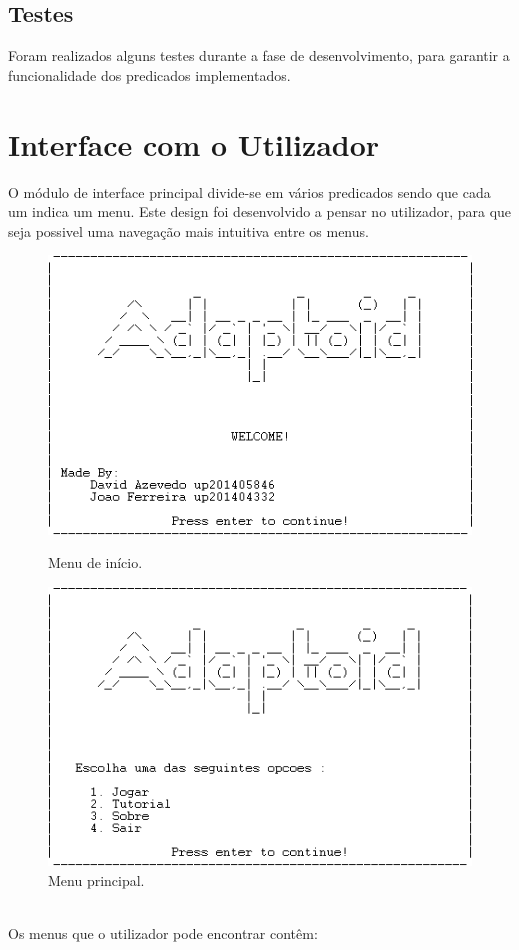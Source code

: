 \documentclass[a4paper]{article}
\begin{document}
\subsection{Testes}

Foram realizados alguns testes durante a fase de desenvolvimento, para garantir a funcionalidade dos predicados implementados.


\newpage
\section{Interface com o Utilizador}

O módulo de interface principal divide-se em vários predicados sendo que cada um indica um menu. Este design foi desenvolvido a pensar no utilizador, para que seja possivel uma navegação mais intuitiva entre os menus.
\begin{figure}[h]
    \begin{minipage}[b]{0.4\textwidth}
        \includegraphics[scale=0.5]{menuPrincipal}
        \caption{Menu de início.}
    \end{minipage}
    \begin{minipage}[b]{0.4\textwidth}
        \includegraphics[scale=0.5]{menuEscolha}
        \caption{Menu principal.}
    \end{minipage}
\end{figure}
\\
Os menus que o utilizador pode encontrar contêm:
\end{document}
